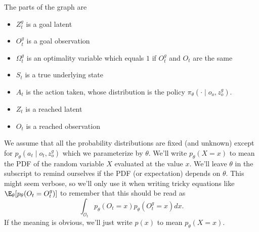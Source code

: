 The parts of the graph are
\begin{itemize}
    \item $Z_t^g$ is a goal latent
    \item $O_t^g$ is a goal observation
    \item $\Omega_t^g$ is an optimality variable which equals $1$ if $O_t^g$ and $O_t$ are the same
    \item $S_t$ is a true underlying state
    \item $A_t$ is the action taken, whose distribution is the policy $\pi_\theta(\cdot \mid o_o, z_o^g)$.
    \item $Z_t$ is a reached latent
    \item $O_t$ is a reached observation
\end{itemize}
We assume that all the probability distributions are fixed (and unknown) except for $p_\theta(a_t \mid o_t, z^g_o)$ which we parameterize by $\theta$.
We'll write $p_\theta(X=x)$ to mean the PDF of the random variable $X$ evaluated at the value $x$.
We'll leave $\theta$ in the subscript to remind ourselves if the PDF (or expectation) depends on $\theta$.
This might seem verbose, so we'll only use it when writing tricky equations like $\E_\theta[ p_\theta(O_t= O_t^g)]$ to remember that this should be read as
\[
\int_{\mathcal O_t} p_\theta(O_t = x) p_\theta(O_t^g = x) dx.
\]
If the meaning is obvious, we'll just write $p(x)$ to mean $p_\theta(X=x)$.

